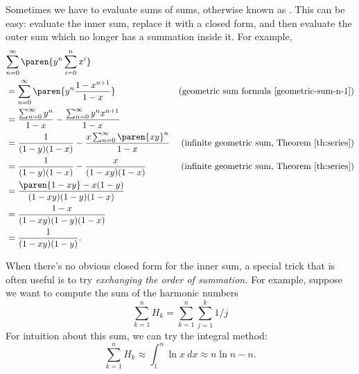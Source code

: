 Sometimes we have to evaluate sums of sums, otherwise known as
.  This can be easy: evaluate the inner
sum, replace it with a closed form, and then evaluate the outer sum which
no longer has a summation inside it.  For example,
\begin{align*}
\lefteqn{\sum_{n=0}^{\infty} \paren{y^n \sum_{i=0}^n x^i}}\\
 & = \sum_{n=0}^{\infty} \paren{y^n \frac{1-x^{n+1}}{1-x}}
     & \text{(geometric sum formula~\eqref{geometric-sum-n-1})}\\
 & = \frac{\sum_{n=0}^{\infty} y^n}{1-x} - \frac{\sum_{n=0}^{\infty} y^nx^{n+1}}{1-x}\\
 & = \frac{1}{(1-y)(1-x)} - \frac{x\sum_{n=0}^{\infty} \paren{xy}^n}{1-x}
      & \text{(infinite geometric sum, Theorem~\ref{th:series})}\\
 & = \frac{1}{(1-y)(1-x)} - \frac{x}{(1-xy)(1-x)}
      & \text{(infinite geometric sum, Theorem~\ref{th:series})}\\
  & = \frac{\paren{1-xy} - x(1-y)}{(1-xy)(1-y)(1-x)}\\
  & = \frac{1-x}{(1-xy)(1-y)(1-x)}\\
  & = \frac{1}{(1-xy)(1-y)}.
\end{align*}

When there's no obvious closed form for the inner sum, a special trick
that is often useful is to try \emph{exchanging the order of summation.}
For example, suppose we want to compute the sum of the harmonic numbers
\[
\sum_{k=1}^n H_k = \sum_{k=1}^n \sum_{j=1}^k 1/j
\]
For intuition about this sum, we can try the integral method:
\[
\sum_{k=1}^n H_k \approx \int_{1}^n \ln x \ dx \approx n\ln n-n.
\]

